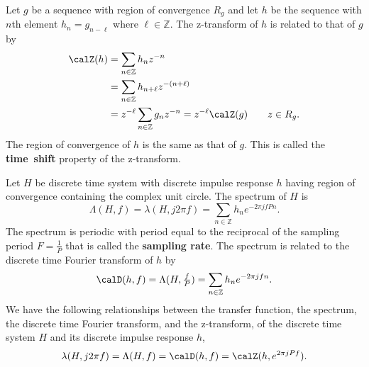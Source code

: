 \documentclass[11pt,a4paper]{book}
\theoremstyle{plain}
\numberwithin{equation}{section}
\newcommand{\ints}{{\mathbb Z}}
\newcommand{\term}{\textbf}
\begin{document}
Let $g$ be a sequence with region of convergence $R_g$ and let $h$ be the sequence with $n$th element $h_n = g_{n-\ell}$ where $\ell \in \ints$.  The z-transform of $h$ is related to that of $g$ by
\begin{align}
\calZ(h) &= \sum_{n \in \ints} h_n z^{-n} \nonumber \\
&= \sum_{n \in \ints} h_{n+\ell} z^{-(n+\ell)} \nonumber \\
&= z^{-\ell} \sum_{n \in \ints} g_n z^{-n} = z^{-\ell} \calZ(g) \qquad z \in R_g. \label{eq:timeshiftpropertyztransform}
\end{align}
The region of convergence of $h$ is the same as that of $g$.  This is called the \term{time~shift} property of the z-transform.  %

Let $H$ be discrete time system with discrete impulse response $h$ having region of convergence containing the complex unit circle.  The spectrum of $H$ is
\[
\Lambda(H,f) = \lambda(H, j2\pi f) = \sum_{n \in \ints} h_n e^{-2\pi j f P n}.
\]
The spectrum is periodic with period equal to the reciprocal of the sampling period $F = \frac{1}{P}$ that is called the \term{sampling rate}. The spectrum is related to the discrete time Fourier transform of $h$ by
\[
\calD(h,f) = \Lambda(H,\tfrac{f}{P}) =\sum_{n \in \ints} h_n e^{-2\pi j f n}.
\]
We have the following relationships between the transfer function, the spectrum, the discrete time Fourier transform, and the z-transform, of the discrete time system $H$ and its discrete impulse response $h$,
\[
\lambda(H, j2\pi f) = \Lambda(H,f) = \calD(h,f) = \calZ(h, e^{2\pi j P f}).
\]
\end{document}

